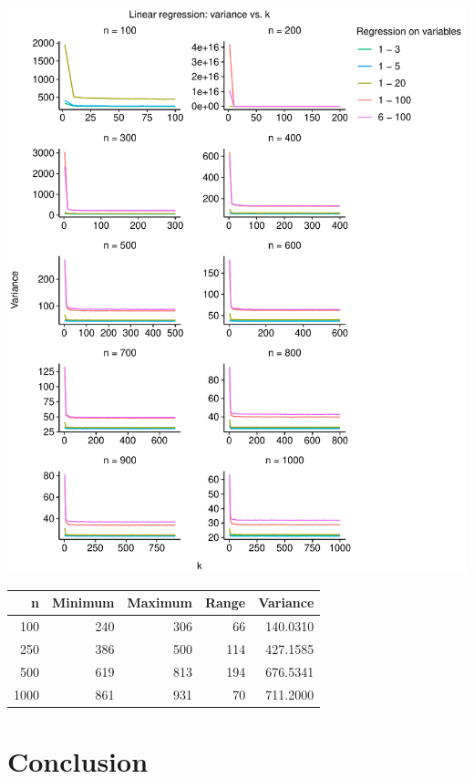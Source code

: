 \documentclass[
  12pt,
]{article}
\begin{document}
\begin{center}\includegraphics{manuscript_files/figure-latex/unnamed-chunk-2-1} \end{center}
\begin{table}[!h]
\centering
\begin{tabular}{r|r|r|r|r}
\hline
n & Minimum & Maximum & Range & Variance\\
\hline
100 & 240 & 306 & 66 & 140.0310\\
\hline
250 & 386 & 500 & 114 & 427.1585\\
\hline
500 & 619 & 813 & 194 & 676.5341\\
\hline
1000 & 861 & 931 & 70 & 711.2000\\
\hline
\end{tabular}
\end{table}

\hypertarget{conclusion}{%
\section{Conclusion}\label{conclusion}}
\end{document}
